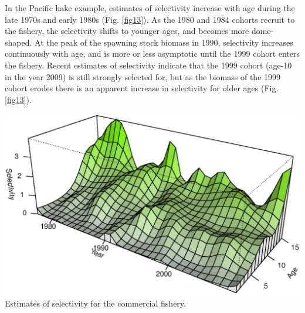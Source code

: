 \begin{multicols}{2}
In the Pacific hake example, estimates of selectivity increase with age during the late 1970s and early 1980s (Fig. \ref{fig13}).  As the 1980 and 1984 cohorts recruit to the fishery, the selectivity shifts to younger ages, and becomes more dome-shaped.  At the peak of the spawning stock biomass in 1990, selectivity increases continuously with age, and is more or less asymptotic until the 1999 cohort enters the fishery.  Recent estimates of selectivity indicate that the 1999 cohort (age-10 in the year 2009) is still strongly selected for, but as the biomass of the 1999 cohort erodes there is an apparent increase in selectivity for older ages (Fig. \ref{fig13}).

\begin{figurehere}
	\centering
	\includegraphics[width=0.9\columnwidth]{iscamFigs/phakefig9a.eps}\\
	\caption{Estimates of selectivity for the commercial fishery.}\label{fig13}
\end{figurehere}



\end{multicols}
